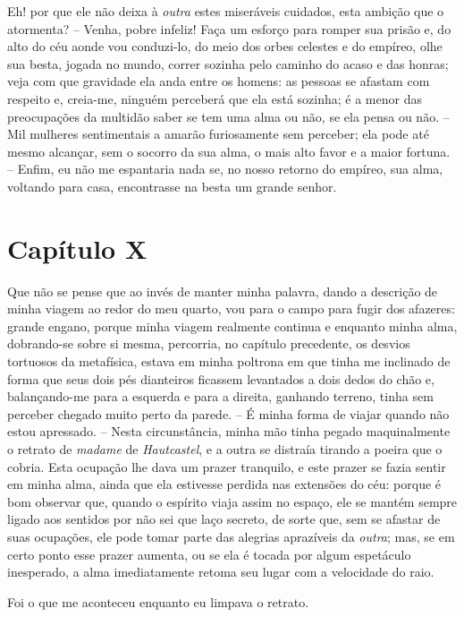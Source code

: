  Eh! por que ele não deixa à \textit{outra} estes miseráveis cuidados,
esta ambição que o atormenta? -- Venha, pobre infeliz! Faça um esforço
para romper sua prisão e, do alto do céu aonde vou conduzi-lo, do meio
dos orbes celestes e do empíreo, olhe sua besta, jogada no mundo,
correr sozinha pelo caminho do acaso e das honras; veja com que
gravidade ela anda entre os homens: as pessoas se afastam com respeito
e, creia-me, ninguém perceberá que ela está sozinha; é a menor das
preocupações da multidão saber se tem uma alma ou não, se ela pensa ou
não. -- Mil mulheres sentimentais a amarão furiosamente sem perceber;
ela pode até mesmo alcançar, sem o socorro da sua alma, o mais alto
favor e a maior fortuna. -- Enfim, eu não me espantaria nada se, no
nosso retorno do empíreo, sua alma, voltando para casa, encontrasse na
besta um grande senhor. 

\section*{Capítulo X}

 Que não se pense que ao invés de manter minha palavra, dando a
descrição de minha viagem ao redor do meu quarto, vou para o campo para
fugir dos afazeres: grande engano, porque minha viagem realmente
continua e enquanto minha alma, dobrando-se sobre si mesma, percorria,
no capítulo precedente, os desvios tortuosos da metafísica, estava em
minha poltrona em que tinha me inclinado de forma que seus dois pés
dianteiros ficassem levantados a dois dedos do chão e, balançando-me
para a esquerda e para a direita, ganhando terreno, tinha sem perceber
chegado muito perto da parede. -- É minha forma de viajar quando não
estou apressado. -- Nesta circunstância, minha mão tinha pegado
maquinalmente o retrato de \textit{madame} de \textit{Hautcastel}, e a
outra se distraía tirando a poeira que o cobria. Esta ocupação lhe dava
um prazer tranquilo, e este prazer se fazia sentir em minha alma, ainda
que ela estivesse perdida nas extensões do céu: porque é bom observar
que, quando o espírito viaja assim no espaço, ele se mantém sempre
ligado aos sentidos por não sei que laço secreto, de sorte que, sem se
afastar de suas ocupações, ele pode tomar parte das alegrias aprazíveis
da \textit{outra}; mas, se em certo ponto esse prazer aumenta, ou se
ela é tocada por algum espetáculo inesperado, a alma imediatamente
retoma seu lugar com a velocidade do raio. 

 Foi o que me aconteceu enquanto eu limpava o retrato.

